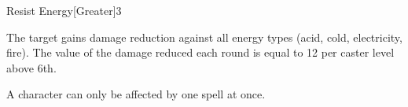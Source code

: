 \begin{spellsection}{Resist Energy}[Greater]{3}
\begin{spellheader}
\end{spellheader}
\begin{spellcontent}
    \begin{spelltargetinginfo}
    \end{spelltargetinginfo}
    \begin{spelleffects}
        \spelleffect The target gains damage reduction against all energy types (acid, cold, electricity, fire). The value of the damage reduced each round is equal to 12  per caster level above 6th.
        \spelldur \durpersonallong
    \end{spelleffects}
\end{spellcontent}
\begin{spellfooter}
    \spellnotes A character can only be affected by one  spell at once.
\end{spellfooter}
\end{spellsection}

